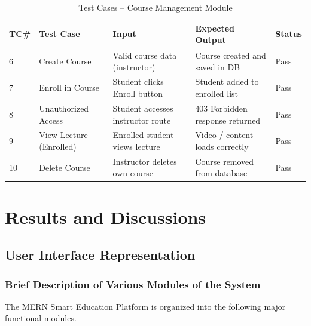 \documentclass[12pt, a4paper, oneside]{report}
\begin{document}
\begin{table}[H]
\centering
\caption{Test Cases -- Course Management Module}
\label{tab:tc_course}
\renewcommand{\arraystretch}{1.3}
\begin{tabular}{|p{0.6cm}|p{3cm}|p{3.2cm}|p{3.2cm}|p{1.3cm}|}
\hline
\textbf{TC\#} & \textbf{Test Case}           & \textbf{Input}                     & \textbf{Expected Output}              & \textbf{Status} \\
\hline
6  & Create Course             & Valid course data (instructor)     & Course created and saved in DB       & Pass \\
\hline
7  & Enroll in Course          & Student clicks Enroll button       & Student added to enrolled list       & Pass \\
\hline
8  & Unauthorized Access       & Student accesses instructor route  & 403 Forbidden response returned      & Pass \\
\hline
9  & View Lecture (Enrolled)   & Enrolled student views lecture     & Video / content loads correctly      & Pass \\
\hline
10 & Delete Course             & Instructor deletes own course      & Course removed from database         & Pass \\
\hline
\end{tabular}
\end{table}
\FloatBarrier

\chapter{Results and Discussions}

\section{User Interface Representation}

\subsection{Brief Description of Various Modules of the System}

The MERN Smart Education Platform is organized into the following major functional modules.
\end{document}
